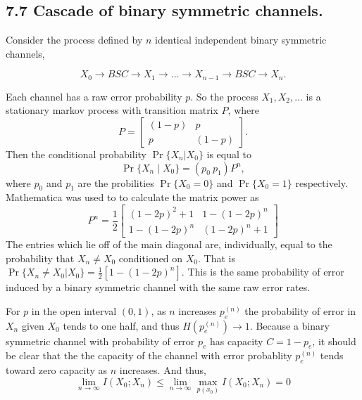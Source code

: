 \documentclass[12pt]{article}
\newcommand{\setbrace}[1]{{\{#1\}}}
\begin{document}
\begin{tiny}
\begin{multicols}{2}
\section*{7.7 Cascade of binary symmetric channels.}

Consider the process defined by $n$ identical independent binary symmetric
channels,

\begin{equation*}
    X_0 \rightarrow \boxed{BSC} \rightarrow X_1 \rightarrow \dots
    \rightarrow X_{n-1} \rightarrow \boxed{BSC} \rightarrow X_n.
\end{equation*}

Each channel has a raw error probability $p$. So the process
$X_1,X_2,\dots$
is a stationary markov process with transition matrix $P$, where
\begin{equation*}
    P = \left[ \begin{array}{ccc}
        (1-p) & p \\
        p & (1-p)
    \end{array} \right].
\end{equation*}
Then the conditional probability $\Pr \setbrace{X_n|X_0}$ is equal to 
\begin{equation*}
    \Pr \setbrace{X_n \mid X_0} =  (p_0\ p_1)P^n,
\end{equation*}
where $p_0$ and $p_1$ are the probilities $\Pr \setbrace{X_0 = 0}$ and
$\Pr \setbrace{X_0 = 1}$ respectively. Mathematica was used to to
calculate the matrix power as
\begin{equation*}
    P^n = \frac{1}{2}\left[ \begin{array}{ccc}
        (1-2p)^2 + 1 & 1-(1-2p)^n \\
        1-(1-2p)^n & (1-2p)^n + 1
    \end{array}\right]
\end{equation*}
The entries which lie off of the main diagonal are, individually, equal to
the probability that $X_n \neq X_0$ conditioned on $ X_0$. That is
$\Pr \{X_n \neq X_0 | X_0\} = \frac{1}{2}[1-(1-2p)^n]$. This is the same
probability of error induced by a binary symmetric channel with the same
raw error rates.

For $p$ in the open interval $(0,1)$, as $n$ increases $p_e^{(n)}$ the probability of
error in $X_n$ given $X_0$ tends to one half, and thus $H(p_e^{(n)}) \rightarrow 1$.
Because a binary symmetric channel with probability of error $p_e$ has
capacity $C = 1-p_e$, it should be clear that the the capacity of the
channel with error probablity $p_e^{(n)}$ tends toward zero capacity as
$n$ increases. And thus,
\begin{equation*}
    \lim_{n \to \infty} I(X_0;X_n) \leq \lim_{n \to \infty} \max_{p(x_0)}
    I(X_0;X_n) = 0
\end{equation*}


\end{multicols}
\end{tiny}
\end{document}
